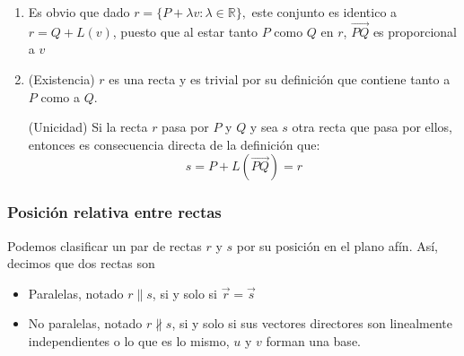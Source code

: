 \documentclass[11pt, a4paper]{article}
\makeatletter
\newif\IfInSansMode
\let\oldsf\sffamily
\renewcommand*{\sffamily}{\oldsf\mathversion{sans}\InSansModetrue}
\let\oldnorm\normalfont
\renewcommand*{\normalfont}{\oldnorm\InSansModefalse\mathversion{normal}}
\renewenvironment{proof}[1][\proofname] {\vspace{-15pt}\par\pushQED{\qed}\normalfont\topsep6\p@\@plus6\p@\relax\trivlist\item[\hskip\labelsep\it#1\@addpunct{.}]\ignorespaces}{\popQED\endtrivlist\@endpefalse}
\renewcommand{\vec}{\overrightarrow}
\renewenvironment{proof}[1][\proofname] {\par\pushQED{\qed}\normalfont\topsep6\p@\@plus6\p@\relax\trivlist\item[\hskip\labelsep\itshape\sffamily#1\@addpunct{.}]\ignorespaces}{\popQED\endtrivlist\@endpefalse}
\theoremstyle{theorem-style}
\theoremstyle{definition-style}
\theoremstyle{remark-style}
\theoremstyle{example-style}
\newenvironment{nlist}
{\begin{enumerate}
    \renewcommand\labelenumi{(\emph{\roman{enumi})}}}
  {\end{enumerate}}
\makeatother
\begin{document}
 \begin{proof} \hfill
 
 \begin{nlist}
	\item Es obvio que dado $r = \{P+\lambda v : \lambda \in \mathbb{R}\},$ este conjunto es identico a $r = Q +L(v)$, puesto que al estar tanto $P$ como $Q$ en $r$, $\vec{PQ}$ es proporcional a $v$

\item (Existencia) $r$ es una recta y es trivial por su definición que contiene tanto a $P$ como a $Q$.

    (Unicidad) Si la recta $r$ pasa por $P$ y $Q$ y sea $s$ otra recta que pasa por ellos, entonces es consecuencia directa de la definición que:
    \[
      s = P+L(\overrightarrow{PQ}) = r
    \]
    
    
\end{nlist}
  \end{proof}

\subsubsection{Posición relativa entre rectas}

Podemos clasificar un par de rectas $r$ y $s$ por su posición en el plano afín. Así, decimos que dos rectas son

\begin{itemize}
\item Paralelas, notado $r\parallel s$, si y solo si $\vec{r} = \vec{s}$
\item No paralelas, notado $r\nparallel s$, si y solo si sus vectores directores son linealmente independientes o lo que es lo mismo, $u$ y $v$ forman una base.
\end{itemize}
\end{document}
